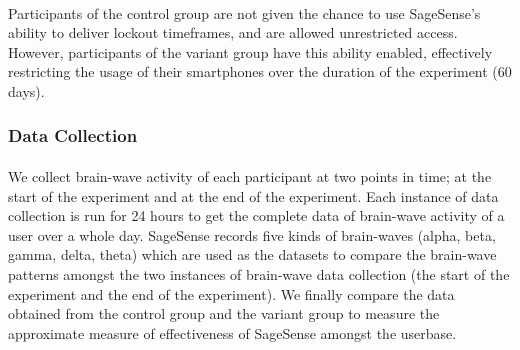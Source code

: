 \documentclass{article}
\begin{document}
\paragraph{} Participants of the control group are not given the chance to use SageSense's ability to deliver lockout timeframes, and are allowed unrestricted access. However, participants of the variant group have this ability enabled, effectively restricting the usage of their smartphones over the duration of the experiment (60 days).

\subsubsection{Data Collection}

\paragraph{} We collect brain-wave activity of each participant at two points in time; at the start of the experiment and at the end of the experiment. Each instance of data collection is run for 24 hours to get the complete data of brain-wave activity of a user over a whole day. SageSense records five kinds of brain-waves (alpha, beta, gamma, delta, theta) which are used as the datasets to compare the brain-wave patterns amongst the two instances of brain-wave data collection (the start of the experiment and the end of the experiment). We finally compare the data obtained from the control group and the variant group to measure the approximate measure of effectiveness of SageSense amongst the userbase.


\clearpage


\end{document}
